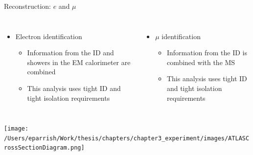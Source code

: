 \documentclass[aspectratio=169,xcolor=table]{beamer}
\begin{document}
    \begin{frame}[t]{Reconstruction: $e$ and $\mu$}
      \begin{columns}[t]
        \begin{itemize}
          \item Electron identification
          \begin{itemize}
            \item Information from the ID and showers in the EM calorimeter are combined
            \item This analysis uses tight ID and tight isolation requirements
          \end{itemize}
        \end{itemize}

        \begin{itemize}
          \item $\mu$ identification
          \begin{itemize}
            \item Information from the ID is combined with the MS
            \item This analysis uses tight ID and tight isolation requirements
          \end{itemize}
        \end{itemize}
      \end{columns}
      \centering
      \texttt{[image: /Users/eparrish/Work/thesis/chapters/chapter3\_experiment/images/ATLASCrossSectionDiagram.png]}
      
    \end{frame}
\end{document}
